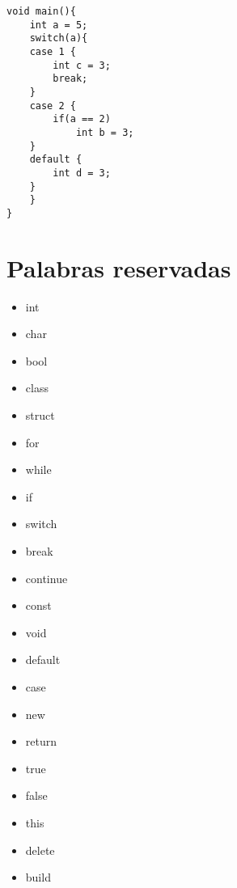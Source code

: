 \documentclass{article}
\begin{document}
\begin{lstlisting}[style=CStyle]
void main(){
    int a = 5;
    switch(a){
    case 1 {
        int c = 3;
        break;
    }
    case 2 {
        if(a == 2)
            int b = 3;
    }
    default {
        int d = 3;
    }
    } 
}
\end{lstlisting}

\section{Palabras reservadas}
\begin{multicols}{4}
\begin{itemize}
    \item int
    \item char
    \item bool
    \item class
    \item struct
    \item for
    \item while
    \item if
    \item switch
    \item break
    \item continue
    \item const
    \item void
    \item default
    \item case
    \item new
    \item return
    \item true
    \item false
    \item this
    \item delete
    \item build

\end{itemize}
\end{multicols}
\end{document}
